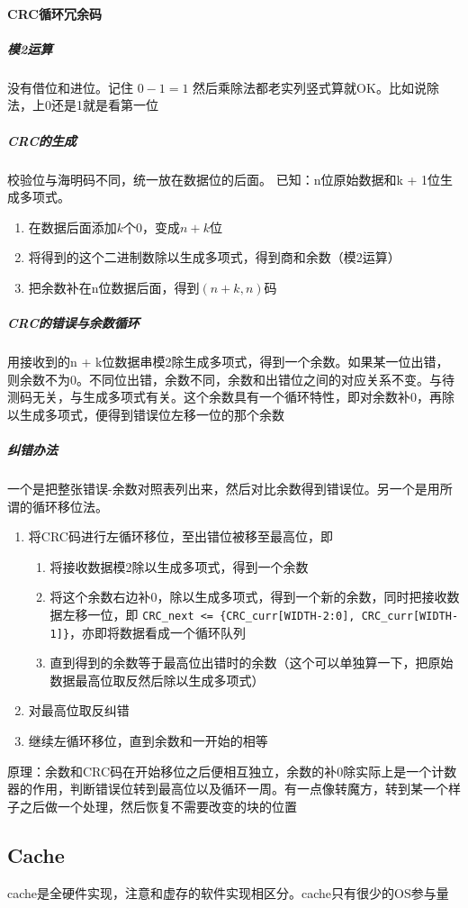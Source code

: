 \documentclass[]{report}
\begin{document}
		\paragraph{CRC循环冗余码}
			\subparagraph{模2运算} 没有借位和进位。记住 $0-1=1$ 然后乘除法都老实列竖式算就OK。比如说除法，上0还是1就是看第一位
			\subparagraph{CRC的生成} 校验位与海明码不同，统一放在数据位的后面。\newline
			已知：n位原始数据和k + 1位生成多项式。
			\begin{enumerate}
				\item 在数据后面添加$k$个0，变成$n+k$位
				\item 将得到的这个二进制数除以生成多项式，得到商和余数（模2运算）
				\item 把余数补在n位数据后面，得到$(n+k,n)$码
			\end{enumerate}
			\subparagraph{CRC的错误与余数循环} 用接收到的n + k位数据串模2除生成多项式，得到一个余数。如果某一位出错，则余数不为0。不同位出错，余数不同，余数和出错位之间的对应关系不变。与待测码无关，与生成多项式有关。这个余数具有一个循环特性，即对余数补0，再除以生成多项式，便得到错误位左移一位的那个余数
			\subparagraph{纠错办法} 一个是把整张错误-余数对照表列出来，然后对比余数得到错误位。另一个是用所谓的循环移位法。
			\begin{enumerate}
				\item 将CRC码进行左循环移位，至出错位被移至最高位，即
				\begin{enumerate}
					\item 将接收数据模2除以生成多项式，得到一个余数
					\item 将这个余数右边补0，除以生成多项式，得到一个新的余数，同时把接收数据左移一位，即 \verb|CRC_next <= {CRC_curr[WIDTH-2:0], CRC_curr[WIDTH-1]}|，亦即将数据看成一个循环队列
					\item 直到得到的余数等于最高位出错时的余数（这个可以单独算一下，把原始数据最高位取反然后除以生成多项式）
				\end{enumerate}
				\item 对最高位取反纠错
				\item 继续左循环移位，直到余数和一开始的相等
			\end{enumerate}
			原理：余数和CRC码在开始移位之后便相互独立，余数的补0除实际上是一个计数器的作用，判断错误位转到最高位以及循环一周。有一点像转魔方，转到某一个样子之后做一个处理，然后恢复不需要改变的块的位置
	\subsection{Cache}
		cache是全硬件实现，注意和虚存的软件实现相区分。cache只有很少的OS参与量
\end{document}
